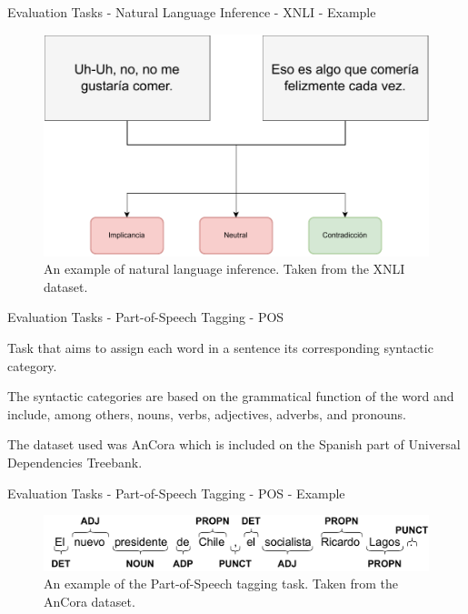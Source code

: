 \documentclass[aspectratio=169,xcolor=dvipsnames]{beamer}
\newenvironment{wideitemize}{\itemize\addtolength{\itemsep}{10pt}}{\enditemize}
\begin{document}
\begin{frame}{Evaluation Tasks - Natural Language Inference - XNLI - Example}

\centering
\begin{figure}
    \includegraphics[scale=0.6]{images/nlp-example-xnli.pdf}
    \caption{An example of natural language inference. Taken from the XNLI \citep{conneau-etal-2018-xnli} dataset.}
    \label{fig:nlp-example-xnli}
\end{figure}


\end{frame}
\begin{frame}{Evaluation Tasks - Part-of-Speech Tagging - POS}

\begin{wideitemize}
    \item Task that aims to assign each word in a sentence its corresponding syntactic category.
    \item The syntactic categories are based on the grammatical function of the word and include, among others, nouns, verbs, adjectives, adverbs, and pronouns.
    \item The dataset used was AnCora \citep{taule-etal-2008-ancora} which is included on the Spanish part of Universal Dependencies \citep{de-marneffe-etal-2021-universal} Treebank.
\end{wideitemize}

\end{frame}
\begin{frame}{Evaluation Tasks - Part-of-Speech Tagging - POS - Example}

\centering
\begin{figure}
    \includegraphics[width=\columnwidth]{images/nlp-example-pos.pdf}
    \caption{An example of the Part-of-Speech tagging task. Taken from the AnCora \citep{taule-etal-2008-ancora} dataset.}
    \label{fig:nlp-example-pos}
\end{figure}

\end{frame}
\end{document}
